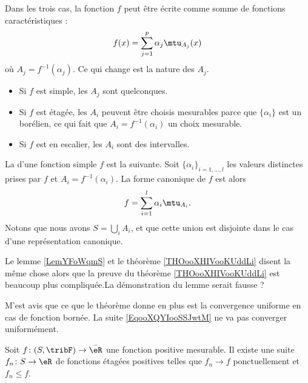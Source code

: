 Dans les trois cas, la fonction \( f\) peut être écrite comme somme de fonctions caractéristiques :
\begin{equation}
    f(x)=\sum_{j=1}^p\alpha_j\mtu_{A_j}(x)
\end{equation}
où \( A_j=f^{-1}(\alpha_j)\). Ce qui change est la nature des \( A_j\).

\begin{itemize}
    \item Si \( f\) est  simple, les \( A_j\) sont quelconques.
    \item Si \( f\) est étagée, les \( A_i\) peuvent être choisis mesurables parce que \( \{\alpha_i \}\) est un borélien, ce qui fait que \( A_i=f^{-1}(\alpha_i)\) un choix mesurable.
    \item Si \( f\) est en escalier, les \( A_i\) sont des intervalles.
\end{itemize}

La  d'une fonction simple \( f\) est la suivante. Soit \( \{ \alpha_i \}_{i=1,\ldots, l}\) les valeurs distinctes prises par \( f\) et \( A_i=f^{-1}(\alpha_i)\). La forme canonique de \( f\) est alors
\begin{equation}
    f=\sum_{i=1}^l\alpha_i\mtu_{A_i}.
\end{equation}
Notons que nous avons \( S=\bigcup_iA_i\), et que cette union est disjointe dans le cas d'une représentation canonique.

\begin{probleme}
    Le lemme \ref{LemYFoWqmS} et le théorème \ref{THOooXHIVooKUddLi} disent la même chose alors que la preuve du théorème \ref{THOooXHIVooKUddLi} est beaucoup plus compliquée.La démonstration du lemme serait fausse ?

    M'est avis que ce que le théorème donne en plus est la convergence uniforme en cas de fonction bornée. La suite \eqref{EqooXQYIooSSJwtM} ne va pas converger uniformément.
\end{probleme}

\begin{lemma}    \label{LemYFoWqmS}
    Soit \( f\colon (S,\tribF)\to \bar\eR\) une fonction positive mesurable. Il existe une suite \( f_n\colon S\to \eR\) de fonctions étagées positives telles que \( f_n\to f\) ponctuellement et \( f_n \leq f\).
\end{lemma}

